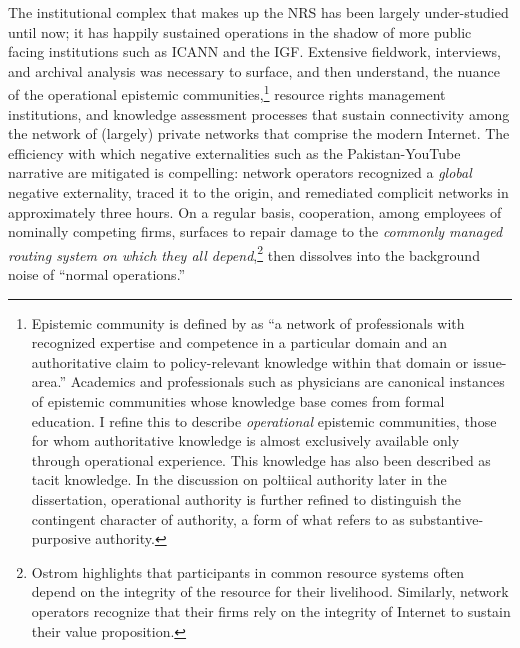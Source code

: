 \documentclass[12pt,journal,compsoc,letterpaper,onecolumn,twoside]{IEEEtran}
\begin{document}
%
The institutional complex that makes up the NRS has been largely
under-studied until now; it has happily sustained operations in the
shadow of more public facing institutions such as ICANN and the IGF.
%
Extensive fieldwork, interviews, and archival analysis was necessary
to surface, and then understand, the nuance of the operational epistemic communities,\footnote{Epistemic
  community is defined by  as ``a network
  of professionals with recognized expertise and competence in a
  particular domain and an authoritative claim to policy-relevant
  knowledge within that domain or issue-area.''  Academics and
  professionals such as physicians are canonical instances of
  epistemic communities whose knowledge base comes from formal education.  I
  refine this to describe \emph{operational} epistemic communities, those
  for whom authoritative knowledge is almost exclusively available only through
  operational experience.  This knowledge has also been described as
  tacit knowledge.  In the discussion on poltiical authority
  later in the dissertation, operational authority is further refined
  to distinguish 
  the contingent character of authority, a form of what
   refers 
  to as substantive-purposive authority.}
resource rights management institutions, and knowledge
assessment processes that sustain connectivity among the network of
(largely) private networks that comprise the modern Internet.
%
%
The efficiency with which negative externalities such as 
the Pakistan-YouTube narrative are mitigated is compelling: network operators recognized a
\emph{global} negative externality, 
traced it to the origin, and remediated complicit networks in 
approximately three hours.  
%
On a regular basis, cooperation, among employees of nominally competing firms,
surfaces to repair damage to the \emph{commonly managed routing system on
which they all depend},\footnote{Ostrom highlights that participants
in common resource systems often depend on the integrity of the 
resource for their livelihood.  Similarly, network operators recognize
that their firms rely on the integrity of Internet to sustain their
value proposition.}  
then dissolves into the background noise of ``normal operations.''
%
%
\end{document}
